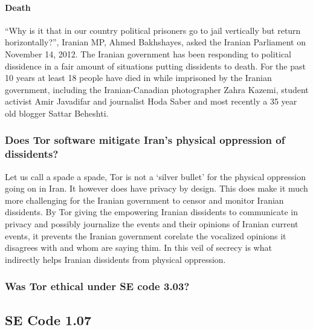 \documentclass[11pt]{article}
\begin{document}
\begin{multicols}{2}

\paragraph{Death}

``Why is it that in our country political prisoners go to jail vertically but return
horizontally?'', Iranian MP, Ahmed Bakhshayes, asked the Iranian Parliament on
November 14, 2012.\cite{IranBloggersDeath} The Iranian government has been
responding to political dissidence in a fair amount of situations  putting
dissidents to death. For the past 10 years at least 18 people have died in while
imprisoned by the Iranian government, including the Iranian-Canadian
photographer Zahra Kazemi, student activist Amir Javadifar and journalist Hoda
Saber and most recently a 35 year old blogger Sattar Beheshti.
\cite{IranBloggersDeath}


\subsubsection{Does Tor software mitigate Iran's physical oppression of
dissidents?}

Let us call a spade a spade, Tor is not a `silver bullet' for the physical
oppression going on in Iran. It however does have privacy by design. This does
make it much more challenging for the Iranian government to censor and monitor
Iranian dissidents. By Tor giving the empowering Iranian dissidents to
communicate in privacy and possibly journalize the events and their opinions of
Iranian current events, it prevents the Iranian government corelate the
vocalized opinions it disagrees with and whom are saying thim. In this veil of
secrecy is what indirectly helps Iranian dissidents from physical oppression.


\subsubsection{Was Tor ethical under SE code 3.03?}


\subsection{SE Code 1.07} 


\end{multicols}
\end{document}
